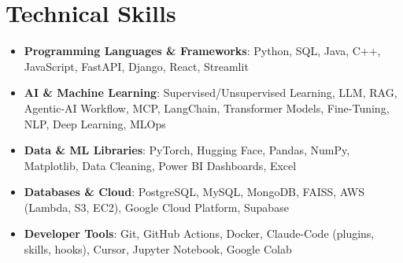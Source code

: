 \documentclass[letterpaper,11pt]{article}
\makeatletter
\newcommand{\resumeItem}[1]{\item\small{#1 \vspace{-4pt}}}
\newcommand{\resumeSubheading}[4]{
    \vspace{-2pt}\item
    \begin{tabular*}{1.0\textwidth}[t]{l@{\extracolsep{\fill}}r}
        \textbf{#1} & \textbf{\small #2} \\
        \textit{\small#3} & \textit{\small #4}
    \end{tabular*}\vspace{-7pt}
}
\newcommand{\resumeSubItem}[1]{\resumeItem{#1}\vspace{-4pt}}
\newcommand{\resumeSubHeadingListStart}{\begin{itemize}[leftmargin=0.0in, label={}]}
\newcommand{\resumeSubHeadingListEnd}{\end{itemize}}
\newcommand{\resumeItemListStart}{\begin{itemize}}
\newcommand{\resumeItemListEnd}{\end{itemize}\vspace{-7pt}}
\makeatother
\begin{document}




\vspace{-0.4cm}
\vspace{3pt}
\section{Technical Skills}
\resumeSubHeadingListStart
\resumeSubItem{\textbf{Programming Languages \& Frameworks}{: Python, SQL, Java, C++, JavaScript, FastAPI, Django, React, Streamlit}}
\vspace{4pt}
\resumeSubItem{\textbf{AI \& Machine Learning}{: Supervised/Unsupervised Learning, LLM, RAG, Agentic-AI Workflow, MCP, LangChain, Transformer Models, Fine-Tuning, NLP, Deep Learning, MLOps}}
\vspace{4pt}
\resumeSubItem{\textbf{Data \& ML Libraries}{: PyTorch, Hugging Face, Pandas, NumPy, Matplotlib, Data Cleaning, Power BI Dashboards, Excel}}
\vspace{4pt}
\resumeSubItem{\textbf{Databases \& Cloud}{: PostgreSQL, MySQL, MongoDB, FAISS, AWS (Lambda, S3, EC2), Google Cloud Platform, Supabase}}
\vspace{4pt}
\resumeSubItem{\textbf{Developer Tools}{: Git, GitHub Actions, Docker, Claude-Code (plugins, skills, hooks), Cursor, Jupyter Notebook, Google Colab}}
\resumeSubHeadingListEnd
\end{document}
